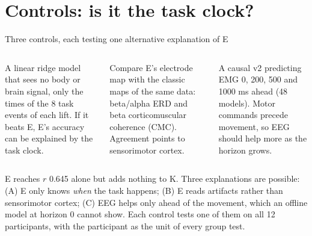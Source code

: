 \documentclass[aspectratio=169,10pt]{beamer}
\begin{document}
\section{Controls: is it the task clock?}

\begin{frame}{Three controls, each testing one alternative explanation of E}
  \begin{columns}[T]
    \begin{tcolorbox}[stagebox,title={A. Task timing}]
      \scriptsize A linear ridge model that sees no body or brain signal, only the times of the 8 task events of each
      lift. If it beats E, E's accuracy can be explained by the task clock.
    \end{tcolorbox}
    \begin{tcolorbox}[stagebox,title={B. Reference maps}]
      \scriptsize Compare E's electrode map with the classic maps of the same data: beta/alpha ERD and beta
      corticomuscular coherence (CMC). Agreement points to sensorimotor cortex.
    \end{tcolorbox}
    \begin{tcolorbox}[stagebox,title={C. Prediction horizon}]
      \scriptsize A causal v2 predicting EMG 0, 200, 500 and 1000 ms ahead (48 models). Motor commands precede
      movement, so EEG should help more as the horizon grows.
    \end{tcolorbox}
  \end{columns}
  \medskip
  \begin{tcolorbox}[notebox,title={Why these three}]
    \scriptsize E reaches $r$ 0.645 alone but adds nothing to K. Three explanations are possible: (A) E only knows
    \emph{when} the task happens; (B) E reads artifacts rather than sensorimotor cortex; (C) EEG helps only ahead of
    the movement, which an offline model at horizon 0 cannot show. Each control tests one of them on all 12
    participants, with the participant as the unit of every group test.
  \end{tcolorbox}
\end{frame}
\end{document}
